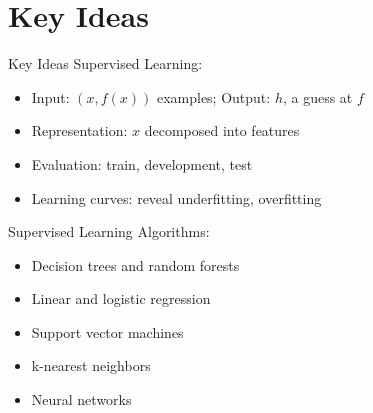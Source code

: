 \documentclass[14pt]{beamer}
\begin{document}
\part{Key Ideas}

\begin{frame}{Key Ideas}
Supervised Learning:
\begin{itemize}
\item Input: $(x, f(x))$ examples; Output: $h$, a guess at $f$
\item Representation: $x$ decomposed into features
\item Evaluation: train, development, test
\item Learning curves: reveal underfitting, overfitting
\end{itemize}
Supervised Learning Algorithms:
\begin{itemize}
\item Decision trees and random forests
\item Linear and logistic regression
\item Support vector machines
\item k-nearest neighbors
\item Neural networks
\end{itemize}
\end{frame}
\end{document}
